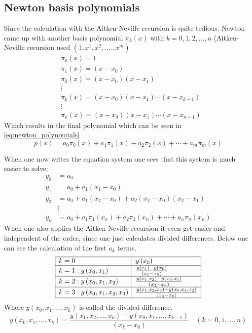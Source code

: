 \subsection{Newton basis polynomials}
Since the calculation with the Aitken-Neville recursion is quite tedious. Newton came up with another basis polynomial $\pi_k(x)$ with $k=0,1,2,...,n$ (Aitken-Neville recursion used $(1,x^1,x^2,....,x^m)$
\begin{equation}\label{eq:newton_basis_polynomials}
    \begin{aligned}
    &\pi_0(x)=1 \\
    &\pi_1(x)=\left(x-x_0\right) \\
    &\pi_2(x)=\left(x-x_0\right)\left(x-x_1\right) \\
    &\vdots \\
    &\pi_k(x)=\left(x-x_0\right)\left(x-x_1\right) \cdots\left(x-x_{k-1}\right) \\
    &\vdots \\
    &\pi_n(x)=\left(x-x_0\right)\left(x-x_1\right) \cdots\left(x-x_{n-1}\right)
    \end{aligned}
\end{equation}
Which results in the final polynomial which can be seen in \autoref{eq:newton_polynomials}
\begin{equation}\label{eq:newton_polynomials}
    p(x)=a_0 \pi_0(x)+a_1 \pi_1(x)+a_2 \pi_2(x)+\cdots+a_m \pi_m(x)
\end{equation}

When one now writes the equation system one sees that this system is much easier to solve:
$$
\begin{aligned}
y_0 &=a_0 \\
y_1 &=a_0+a_1\left(x_1-x_0\right) \\
y_2 &=a_0+a_1\left(x_2-x_0\right)+a_2\left(x_2-x_0\right)\left(x_2-x_1\right) \\
& \vdots \\
y_n &=a_0+a_1 \pi_1\left(x_n\right)+a_2 \pi_2\left(x_n\right)+\cdots+a_n \pi_n\left(x_n\right)
\end{aligned}
$$
When one also applies the Aitken-Neville recursion it even get easier and independent of the order, since one just calculates divided differences.
Below one can see the calculation of the first $a_k$ terms.
$$
\begin{array}{|l|l|}
\hline k=0 & y\left(x_0\right) \\
\hline k=1: y\left(x_0, x_1\right) & \frac{y\left(x_1\right)-y\left(x_0\right)}{\left(x_1-x_0\right)} \\
\hline k=2: y\left(x_0, x_1, x_2\right) & \frac{y\left(x_1, x_2\right)-y\left(x_0, x_1\right)}{\left(x_2-x_0\right)} \\
\hline k=3: y\left(x_0, x_1, x_2, x_3\right) & \frac{y\left(x_1, x_2, x_3\right)-y\left(x_0, x_1, x_2\right)}{\left(x_3-x_0\right)} \\
\hline
\end{array}
$$
Where $y\left(x_0, x_1, \ldots, x_k\right)$ is called the divided difference.
$$
y\left(x_0, x_1, \ldots, x_k\right)=\frac{y\left(x_1, x_2, \ldots, x_k\right)-y\left(x_0, x_1, \ldots, x_{k-1}\right)}{\left(x_k-x_0\right)} \quad(k=0,1, \ldots, n)
$$

